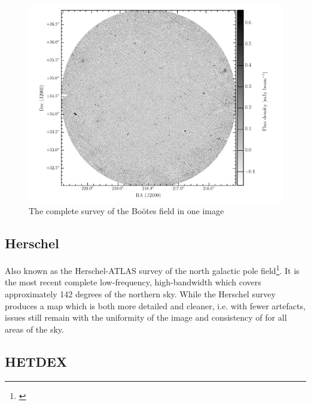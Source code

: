\documentclass{article}
\begin{document}
\begin{figure}
    \centering
    \includegraphics[scale = 0.5]{bootes.png}
    \caption{The complete survey of the Bo{\"o}tes field in one image}
\end{figure}

\subsection{Herschel}
Also known as the Herschel-ATLAS survey of the north galactic pole field\footnote{\cite{hatlas}}. It is the most recent complete low-frequency, high-bandwidth which covers approximately 142 degrees of the northern sky. While the Herschel survey produces a map which is both more detailed and cleaner, i.e. with fewer artefacts, issues still remain with the uniformity of the image and consistency of for all areas of the sky.

\subsection{HETDEX}
\end{document}
